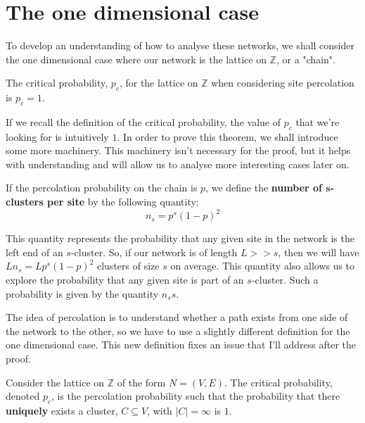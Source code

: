 \section{The one dimensional case}
To develop an understanding of how to analyse these networks, we shall consider the one dimensional case where our network is the lattice on $\mathbb{Z}$, or a "chain". %

\begin{theorem}\label{thm:critical probability z1 site percolation}
  The critical probability, $p_c$, for the lattice on $\mathbb{Z}$ when considering site percolation is $p_c = 1$.
\end{theorem}

If we recall the definition of the critical probability, the value of $p_c$ that we're looking for is intuitively $1$. In order to prove this theorem, we shall introduce some more
machinery. This machinery isn't necessary for the proof, but it helps with understanding and will allow us to analyse more interesting cases later on.

\begin{definition}\label{def:s-clusters per site}
  If the percolation probability on the chain is $p$, we define the \textbf{number of $\mathbf{s}$-clusters per site} by the following quantity:
  $$n_s = p^s(1-p)^2$$
\end{definition}

This quantity represents the probability that any given site in the network is the left end of an $s$-cluster. So, if our network is of length $L >> s$, then we will have
$Ln_s=Lp^s(1-p)^2$ clusters of size $s$ on average. This quantity also allows us to explore the probability that any given site is part of an $s$-cluster. Such a probability is
given by the quantity $n_ss$.

The idea of percolation is to understand whether a path exists from one side of the network to the other, so we have to use a slightly different definition for the one dimensional
case. This new definition fixes an issue that I'll address after the proof.

\begin{definition}\label{def:critical probability special case}
  Consider the lattice on $\mathbb{Z}$ of the form $N = (V, E)$. The critical probability, denoted $p_c$, is the percolation probability such that the probability that there
  \textbf{uniquely} exists a cluster, $C
  \subseteq V$, with $|C| = \infty$ is $1$.
\end{definition}

